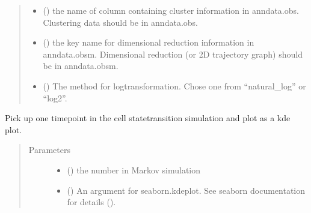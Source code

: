 \documentclass[letterpaper,10pt,english]{sphinxmanual}
\begin{document}
\begin{fulllineitems}
\begin{fulllineitems}
\begin{quote}
\begin{description}
\begin{itemize}
\item {} 
 () \textendash{} the name of column containing cluster information in anndata.obs.
Clustering data should be in anndata.obs.

\item {} 
 () \textendash{} the key name for dimensional reduction information in anndata.obsm.
Dimensional reduction (or 2D trajectory graph) should be in anndata.obsm.

\item {} 
 () \textendash{} The method for log\sphinxhyphen{}transformation. Chose one from “natural\_log” or “log2”.

\end{itemize}

\end{description}\end{quote}

\end{fulllineitems}


\begin{fulllineitems}
\label{\detokenize{modules/celloracle:celloracle.Oracle.plot_mc_result_as_kde}}
Pick up one timepoint in the cell state\sphinxhyphen{}transition simulation and plot as a kde plot.
\begin{quote}\begin{description}
\item[{Parameters}] \leavevmode\begin{itemize}
\item {} 
 () \textendash{} the number in Markov simulation

\item {} 
 () \textendash{} An argument for seaborn.kdeplot.
See seaborn documentation for details ().


\end{itemize}
\end{description}
\end{quote}
\end{fulllineitems}
\end{fulllineitems}
\end{document}
